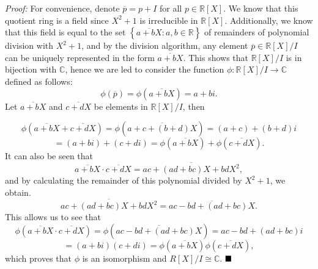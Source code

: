 \documentclass[12pt]{article}
\newcommand{\R}{\ensuremath{\mathbb{R}}}
\newcommand{\C}{\ensuremath{\mathbb{C}}}
\newcommand{\braceb}[1]{\left\{#1\right\}}
\newcommand{\parenb}[1]{\left(#1\right)}
\newcommand{\proof}{\textit{Proof: }}
\newcommand{\done}{\ensuremath{\strut\hfill\blacksquare}}
\begin{document}
\proof
For convenience, denote \( \overline{p} = p + I \) for all \( p \in \R[X] \).
We know that this quotient ring is a field since \( X^2 + 1 \) is irreducible
in \( \R[X] \).
Additionally, we know that this field is equal to the set
\( \braceb{\overline{a + bX} : a, b \in \R} \) of remainders of polynomial
division with \( X^2 + 1 \), and by the division algorithm, any element
\( \overline{p} \in \R[X]/I \) can be uniquely represented in the form
\( \overline{a + bX} \).
This shows that \( \R[X]/I \) is in bijection with \C, hence we are led to
consider the function \( \phi : \R[X]/I \to \C \) defined as follows:
\[
	\phi(\overline{p}) = \phi\parenb{\overline{a + bX}} = a + bi.
\]
Let \( \overline{a + bX} \) and \( \overline{c + dX} \) be elements in
\( \R[X]/I \), then

\[
	\phi\parenb{\overline{a + bX} + \overline{c + dX}}
	= \phi\parenb{\overline{a + c + (b + d)X}}
	= (a + c) + (b + d)i
\]
\[
	= (a + bi) + (c + di)
	= \phi\parenb{\overline{a + bX}} + \phi\parenb{\overline{c + dX}}.
\]
It can also be seen that
\[
	\overline{a + bX} \cdot \overline{c + dX}
	= \overline{ac + (ad + bc)X + bdX^2},
\]
and by calculating the remainder of this polynomial divided by \( X^2 + 1 \),
we obtain.
\[
	\overline{ac + (ad + bc)X + bdX^2}
	= \overline{ac - bd + (ad + bc)X}.
\]
This allows us to see that
\[
	\phi\parenb{\overline{a + bX} \cdot \overline{c + dX}}
	= \phi\parenb{\overline{ac - bd + (ad + bc)X}}
	= ac - bd + (ad + bc)i
\]
\[
	= (a + bi)(c + di)
	= \phi\parenb{\overline{a + bX}}\phi\parenb{\overline{c + dX}},
\]
which proves that \( \phi \) is an isomorphism and \( R[X]/I \cong \C \).
\done
\end{document}
